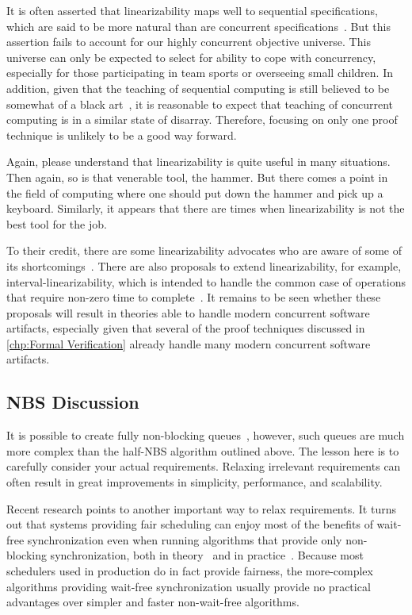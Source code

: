 It is often asserted that linearizability maps well to sequential
specifications, which are said to be more natural than are concurrent
specifications~\cite{SergioRajsbaum2020HistoryLinearizability}.
But this assertion fails to account for our highly concurrent objective
universe.
This universe can only be expected to select for ability to cope with
concurrency, especially for those participating in team sports or
overseeing small children.
In addition, given that the teaching of sequential
computing is still believed to be somewhat of a black
art~\cite{ElizabethPatitsas2020GradesNotBimodal}, it is reasonable
to expect that teaching of concurrent computing is in a similar state
of disarray.
Therefore, focusing on only one proof technique is unlikely to be a
good way forward.

Again, please understand that linearizability is quite useful in many
situations.
Then again, so is that venerable tool, the hammer.
But there comes a point in the field of computing where one should put
down the hammer and pick up a keyboard.
Similarly, it appears that there are times when linearizability is not
the best tool for the job.

To their credit, there are some linearizability advocates who are aware
of some of its shortcomings~\cite{SergioRajsbaum2020HistoryLinearizability}.
There are also proposals to extend linearizability, for example,
interval-linearizability, which is intended to handle the common case
of operations that require non-zero time to
complete~\cite{10.1145/3266457}.
It remains to be seen whether these proposals will result in theories
able to handle modern concurrent software artifacts, especially given
that several of the proof techniques discussed in \cref{chp:Formal
Verification} already handle many modern concurrent software artifacts.

\subsection{NBS Discussion}
\label{sec:advsync:NBS Discussion}

It is possible to create fully non-blocking queues~\cite{MichaelScott96},
however, such queues are much more complex than the half-NBS algorithm
outlined above.
The lesson here is to carefully consider your actual requirements.
Relaxing irrelevant requirements can often result in great
improvements in simplicity, performance, and scalability.

Recent research points to another important way to relax requirements.
It turns out that systems providing fair scheduling can enjoy most
of the benefits of wait-free synchronization even when running
algorithms that provide only non-blocking
synchronization, both in theory~\cite{DanAlitarh2013PracticalProgress}
and in practice~\cite{SamyAlBahra2013NBS}.
Because most schedulers used in production do in fact provide fairness,
the more-complex algorithms providing wait-free synchronization usually
provide no practical advantages over simpler and faster non-wait-free
algorithms.

